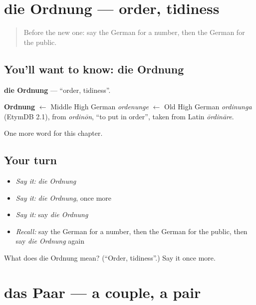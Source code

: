 \section[die Ordnung]{die Ordnung — order, tidiness}

\label{lesson:GE-C235-ordnung}



\begin{quote}
Before the new one: say the German for a number, then the German for the public.
\end{quote}

\subsection*{You'll want to know: die Ordnung}
\textbf{die Ordnung} — \textquotedblleft{}order, tidiness\textquotedblright{}.

\begin{cousinweb}
\textbf{Ordnung} $\leftarrow$ Middle High German \emph{ordenunge} $\leftarrow$ Old High German \emph{ordinunga} (EtymDB 2.1), from \emph{ordinōn}, \textquotedblleft{}to put in order\textquotedblright{}, taken from Latin \emph{ōrdināre}.
\end{cousinweb}

\begin{grammarlens}[title={What you've built}]
One more word for this chapter.
\end{grammarlens}

\subsection*{Your turn}
\begin{itemize}
\raggedright
  \item \emph{Say it:} \emph{die Ordnung}
  \item \emph{Say it:} \emph{die Ordnung}, once more
  \item \emph{Say it:} say \emph{die Ordnung}
  \item \emph{Recall:} say the German for a number, then the German for the public, then say \emph{die Ordnung} again
\end{itemize}

\begin{tcolorbox}[breakable,colback=teal!4,colframe=teal!35!black,title={Before you move on}]
What does die Ordnung mean? (\textquotedblleft{}Order, tidiness\textquotedblright{}.) Say it once more.
\end{tcolorbox}
\section[das Paar]{das Paar — a couple, a pair}

